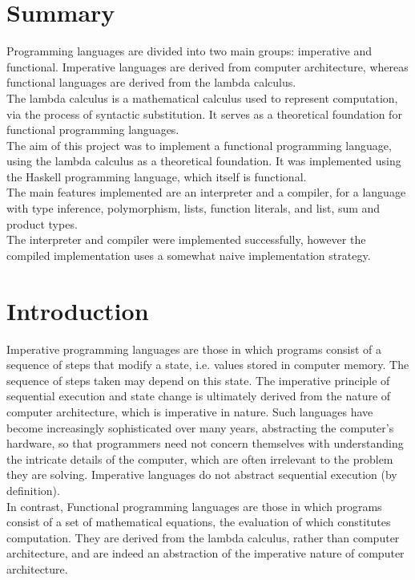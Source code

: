 \documentclass{article}
\begin{document}
\section*{Summary}
Programming languages are divided into two main groups: imperative and functional. Imperative languages are derived from computer architecture, whereas functional languages are derived from the lambda calculus.
\\\indent The lambda calculus is a mathematical calculus used to represent computation, via the process of syntactic substitution. It serves as a theoretical foundation for functional programming languages.
\\\indent The aim of this project was to implement a functional programming language, using the lambda calculus as a theoretical foundation. It was implemented using the Haskell programming language, which itself is functional.
\\\indent The main features implemented are an interpreter and a compiler, for a language with type inference, polymorphism, lists, function literals, and list, sum and product types.
\\\indent The interpreter and compiler were implemented successfully, however the compiled implementation uses a somewhat naive implementation strategy.
\pagebreak

\tableofcontents
\pagebreak

\section{Introduction}

Imperative programming languages are those in which programs consist of a sequence of steps that modify a state, i.e. values stored in computer memory. The sequence of steps taken may depend on this state. The imperative principle of sequential execution and state change is ultimately derived from the nature of computer architecture, which is imperative in nature. Such languages have become increasingly sophisticated over many years, abstracting the computer's hardware, so that programmers need not concern themselves with understanding the intricate details of the computer, which are often irrelevant to the problem they are solving. Imperative languages do not abstract sequential execution (by definition).
\\
\indent In contrast, Functional programming languages are those in which programs consist of a set of mathematical equations, the evaluation of which constitutes computation. They are derived from the lambda calculus, rather than computer architecture, and are indeed an abstraction of the imperative nature of computer architecture.
\end{document}

